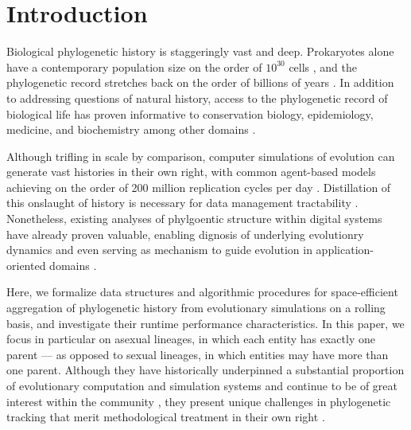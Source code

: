 \section{Introduction} \label{sec:introduction}

Biological phylogenetic history is staggeringly vast and deep.
Prokaryotes alone have a contemporary population size on the order of $10^{30}$ cells \citep{whitman1998prokaryotes}, and the phylogenetic record stretches back on the order of billions of years \citep{arndt2012processes}.
In addition to addressing questions of natural history, access to the phylogenetic record of biological life has proven informative to conservation biology, epidemiology, medicine, and biochemistry among other domains \citep{faithConservationEvaluationPhylogenetic1992, STAMATAKIS2005phylogenetics, frenchHostPhylogenyShapes2023,kim2006discovery}.

Although trifling in scale by comparison, computer simulations of evolution can generate vast histories in their own right, with common agent-based models achieving on the order of 200 million replication cycles per day \citep{ofria2009avida}.
Distillation of this onslaught of history is necessary for data management tractability \citep{dolson2020interpreting}.
Nonetheless, existing analyses of phylgoentic structure within digital systems have already proven valuable, enabling dignosis of underlying evolutionry dynamics \citep{moreno2023toward,hernandez2022can,shahbandegan2022untangling, lewinsohnStatedependentEvolutionaryModels2023a} and even serving as mechanism to guide evolution in application-oriented domains \cite{lalejini2024methods,murphy2008simple,burke2003increased}.

Here, we formalize data structures and algorithmic procedures for space-efficient aggregation of phylogenetic history from evolutionary simulations on a rolling basis, and investigate their runtime performance characteristics.
In this paper, we focus in particular on asexual lineages, in which each entity has exactly one parent --- as opposed to sexual lineages, in which entities may have more than one parent.
Although they have historically underpinned a substantial proportion of evolutionary computation and simulation systems \citep{koza1994genetic,jefferson1990evolution} and continue to be of great interest within the community \citep{dang2018escaping}, they present unique challenges in phylogenetic tracking that merit methodological treatment in their own right \citep{godin2019apoget,moreno2024methods,mcphee2018detailed}.


